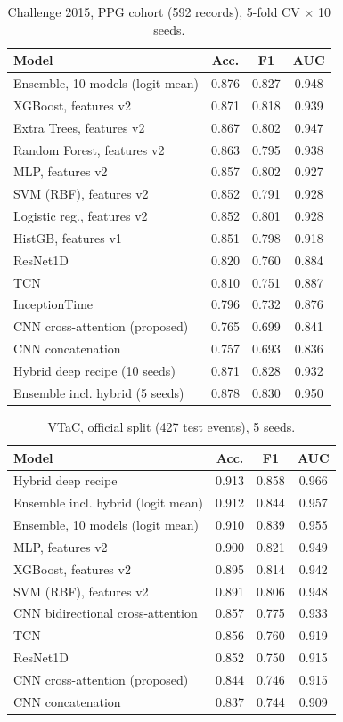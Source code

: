 \documentclass[conference]{IEEEtran}
\begin{document}
\begin{table}[t]
\caption{Challenge 2015, PPG cohort (592 records), 5-fold CV $\times$ 10 seeds.}
\label{tab:cinc}
\centering
\small
\begin{tabular}{lccc}
\toprule
Model & Acc. & F1 & AUC\\
\midrule
Ensemble, 10 models (logit mean) & 0.876 & 0.827 & 0.948\\
XGBoost, features v2 & 0.871 & 0.818 & 0.939\\
Extra Trees, features v2 & 0.867 & 0.802 & 0.947\\
Random Forest, features v2 & 0.863 & 0.795 & 0.938\\
MLP, features v2 & 0.857 & 0.802 & 0.927\\
SVM (RBF), features v2 & 0.852 & 0.791 & 0.928\\
Logistic reg., features v2 & 0.852 & 0.801 & 0.928\\
HistGB, features v1 & 0.851 & 0.798 & 0.918\\
ResNet1D & 0.820 & 0.760 & 0.884\\
TCN & 0.810 & 0.751 & 0.887\\
InceptionTime & 0.796 & 0.732 & 0.876\\
CNN cross-attention (proposed) & 0.765 & 0.699 & 0.841\\
CNN concatenation & 0.757 & 0.693 & 0.836\\
\midrule
Hybrid deep recipe (10 seeds) & 0.871 & 0.828 & 0.932\\
Ensemble incl. hybrid (5 seeds) & 0.878 & 0.830 & 0.950\\
\bottomrule
\end{tabular}
\end{table}

\begin{table}[t]
\caption{VTaC, official split (427 test events), 5 seeds.}
\label{tab:vtac}
\centering
\small
\begin{tabular}{lccc}
\toprule
Model & Acc. & F1 & AUC\\
\midrule
Hybrid deep recipe & 0.913 & 0.858 & 0.966\\
Ensemble incl. hybrid (logit mean) & 0.912 & 0.844 & 0.957\\
Ensemble, 10 models (logit mean) & 0.910 & 0.839 & 0.955\\
MLP, features v2 & 0.900 & 0.821 & 0.949\\
XGBoost, features v2 & 0.895 & 0.814 & 0.942\\
SVM (RBF), features v2 & 0.891 & 0.806 & 0.948\\
CNN bidirectional cross-attention & 0.857 & 0.775 & 0.933\\
TCN & 0.856 & 0.760 & 0.919\\
ResNet1D & 0.852 & 0.750 & 0.915\\
CNN cross-attention (proposed) & 0.844 & 0.746 & 0.915\\
CNN concatenation & 0.837 & 0.744 & 0.909\\
\bottomrule
\end{tabular}
\end{table}
\end{document}
